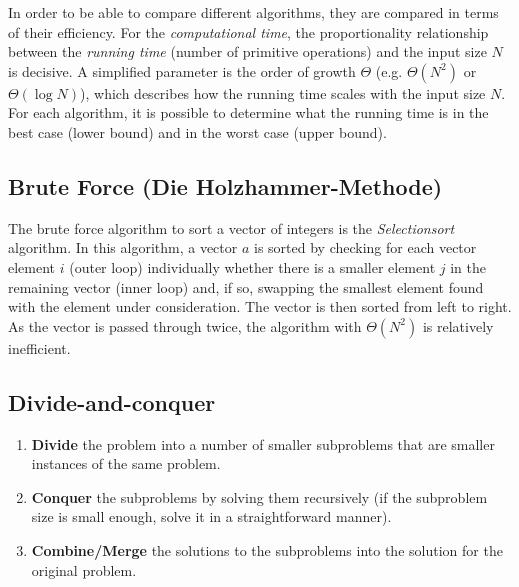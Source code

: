 

In order to be able to compare different algorithms, they are compared in terms of their efficiency. For the \emph{computational time}, the proportionality relationship between the \emph{running time} (number of primitive operations) and the input size $N$ is decisive. A simplified parameter is the order of growth $\Theta$ (e.g. $\Theta(N^2)$ or $\Theta(\log N)$), which describes how the running time scales with the input size $N$. For each algorithm, it is possible to determine what the running time is in the best case (lower bound) and in the worst case (upper bound).

\subsection{Brute Force (Die Holzhammer-Methode)}


The brute force algorithm to sort a vector of integers is the \emph{Selectionsort} algorithm. In this algorithm, a vector $a$ is sorted by checking for each vector element $i$ (outer loop) individually whether there is a smaller element $j$ in the remaining vector (inner loop) and, if so, swapping the smallest element found with the element under consideration. The vector is then sorted from left to right. As the vector is passed through twice, the algorithm with $\Theta(N^2)$ is relatively inefficient.



\subsection{Divide-and-conquer}

\begin{enumerate}
    \item \textbf{Divide} the problem into a number of smaller subproblems that are smaller instances of the same problem.
    \item \textbf{Conquer} the subproblems by solving them recursively (if the subproblem size is small enough, solve it in a straightforward manner).
    \item \textbf{Combine/Merge} the solutions to the subproblems into the solution for the original problem.
\end{enumerate}

